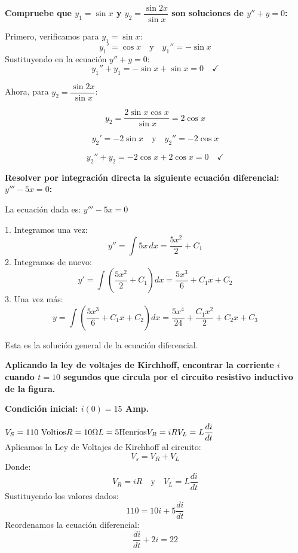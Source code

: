 \documentclass[answers]{exam}
\begin{document}
\begin{questions}

	\question \large\textbf{Compruebe que $y_1 = \sin x$ y $y_2=\dfrac{\sin 2x}{\sin x}$ son soluciones de $y''+y=0$:}

	Primero, verificamos para $y_1 = \sin x$:  
	\[
	y_1' = \cos x \quad \text{y} \quad y_1'' = -\sin x
	\]
	Sustituyendo en la ecuación $y'' + y = 0$:  
	\[
	y_1'' + y_1 = -\sin x + \sin x = 0 \quad \checkmark
	\]
	
	Ahora, para $y_2 = \dfrac{\sin 2x}{\sin x}$:  
	
	\[
	y_2 = \frac{2\sin x \cos x}{\sin x} = 2\cos x
	\]
	 
	\[
	y_2' = -2\sin x \quad \text{y} \quad y_2'' = -2\cos x
	\]
	 
	\[
	y_2'' + y_2 = -2\cos x + 2\cos x = 0 \quad \checkmark
	\]

	\vspace{0.5cm}
	
	
	\question \large\textbf{Resolver por integración directa la siguiente ecuación diferencial: $y''' - 5x = 0$:}

	La ecuación dada es: $y''' - 5x = 0$  

	1. Integramos una vez: \[y'' = \int 5x \, dx = \dfrac{5x^2}{2} + C_1\]  
	2. Integramos de nuevo: \[y' = \int \left(\dfrac{5x^2}{2} + C_1\right) dx = \dfrac{5x^3}{6} + C_1x + C_2\]  
	3. Una vez más: \[y = \int \left(\dfrac{5x^3}{6} + C_1x + C_2\right) dx = \dfrac{5x^4}{24} + \dfrac{C_1x^2}{2} + C_2x + C_3\]  

	Esta es la solución general de la ecuación diferencial. 
	
	\vspace{0.5cm}
	
	
	\question \large\textbf{Aplicando la ley de voltajes de Kirchhoff, encontrar la corriente $i$ cuando $t=10$ segundos que circula por el circuito resistivo inductivo de la figura.}
	
	\large\textbf{Condición inicial: $i(0)=15$ Amp.}

	\(
		V_S = 110 \text{ Voltios}\\
		R = 10 \Omega\\	
		L = 5 \text{Henrios}\\	
		V_R = iR\\
		V_L = L\dfrac{di}{dt}	
	\)\\

		Aplicamos la Ley de Voltajes de Kirchhoff al circuito:  
		\[
		V_s = V_R + V_L
		\]
		Donde:  
		\[
		V_R = iR \quad \text{y} \quad V_L = L \frac{di}{dt}
		\]
		Sustituyendo los valores dados:  
		\[
		110 = 10i + 5\frac{di}{dt}
		\]
		Reordenamos la ecuación diferencial:  
		\[
		\frac{di}{dt} + 2i = 22
		\]
		

\end{questions}
\end{document}
